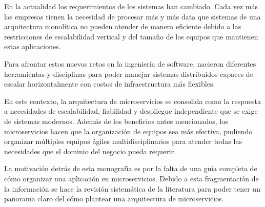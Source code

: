 
En la actualidad los requerimientos de los sistemas han cambiado.
Cada vez más las empresas tienen la necesidad de procesar más y más data que sistemas de
una arquitectura monolítica no pueden atender de manera eficiente debido a las restricciones
de escalabilidad vertical y del tamaño de los equipos que mantienen estas aplicaciones.

Para afrontar estos nuevos retos en la ingeniería de software, nacieron diferentes herramientas
y disciplinas para poder manejar sistemas distribuidos capaces de escalar horizontalmente con costos
de infraestructura más flexibles.

En este contexto, la arquitectura de microservicios se consolida como la respuesta a necesidades
de escalabilidad, fiabilidad y despliegue independiente que se exige de sistemas modernos.
Además de los beneficios antes mencionados, los microservicios hacen que la organización de equipos
sea más efectiva, pudiendo organizar múltiples equipos ágiles multidisciplinarios para atender
todas las necesidades que el dominio del negocio pueda requerir.

La motivación detrás de esta monografía es por la falta de una guía completa de cómo
organizar una aplicación en microservicios.
Debido a esta fragmentación de la información se hace la revisión sistemática de
la literatura para poder tener un panorama claro del cómo plantear una arquitectura de microservicios.

\newpage
